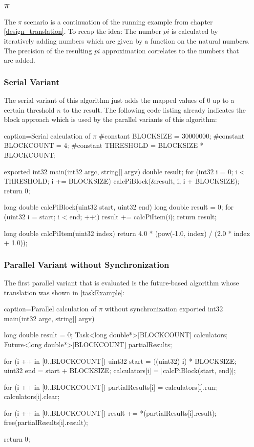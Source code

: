 \subsection{$\pi$}
The $\pi$ scenario is a continuation of the running example from chapter \ref{design_translation}. To recap the idea: The number $pi$ is calculated by iteratively adding numbers which are given by a function on the natural numbers. The precision of the resulting $pi$ approximation correlates to the numbers that are added. 

\subsubsection{Serial Variant}
The serial variant of this algorithm just adds the mapped values of $0$ up to a certain threshold $n$ to the result. The following code listing already indicates the block approach which is used by the parallel variants of this algorithm:

\begin{ccode}{caption=Serial calculation of $\pi$}
#constant BLOCKSIZE = 30000000; 
#constant BLOCKCOUNT = 4; 
#constant THRESHOLD = BLOCKSIZE * BLOCKCOUNT;

exported int32 main(int32 argc, string[] argv) { 
  double result;   
  for (int32 i = 0; i < THRESHOLD; i += BLOCKSIZE) { 
    calcPiBlock(&result, i, i + BLOCKSIZE); 
  }   
  return 0; 
}

long double calcPiBlock(uint32 start, uint32 end) { 
  long double result = 0; 
  for (uint32 i = start; i < end; ++i) { 
    result += calcPiItem(i); 
  }
  return result; 
}
 
long double calcPiItem(uint32 index) { 
  return 4.0 * (pow(-1.0, index) / (2.0 * index + 1.0)); 
}
\end{ccode}

\subsubsection{Parallel Variant without Synchronization}
The first parallel variant that is evaluated is the future-based algorithm whose translation was shown in \ref{taskExample}:
\begin{ccode}{caption=Parallel calculation of $\pi$ without synchronization}
exported int32 main(int32 argc, string[] argv) { 
  long double result = 0; 
  Task<long double*>[BLOCKCOUNT] calculators; 
  Future<long double*>[BLOCKCOUNT] partialResults; 
   
  for (i ++ in [0..BLOCKCOUNT[) { 
    uint32 start = ((uint32) i) * BLOCKSIZE; 
    uint32 end = start + BLOCKSIZE; 
    calculators[i] = |calcPiBlock(start, end)|; 
  }
   
  for (i ++ in [0..BLOCKCOUNT[) { 
    partialResults[i] = calculators[i].run; 
    calculators[i].clear; 
  }
   
  for (i ++ in [0..BLOCKCOUNT[) { 
    result += *(partialResults[i].result); 
    free(partialResults[i].result); 
  }
   
  return 0; 
}
\end{ccode}

